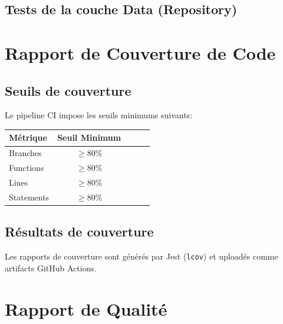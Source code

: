 \documentclass[12pt,a4paper]{report}
\begin{document}
\section{Tests de la couche Data (Repository)}

\begin{center}
\end{center}

\begin{center}
\end{center}

\chapter{Rapport de Couverture de Code}

\section{Seuils de couverture}

Le pipeline CI impose les seuils minimums suivants:

\begin{center}
    \begin{tabular}{lcccc}
        \toprule
        \textbf{Métrique} & \textbf{Seuil Minimum} \\
        \midrule
        Branches          & $\geq 80\%$            \\
        Functions         & $\geq 80\%$            \\
        Lines             & $\geq 80\%$            \\
        Statements        & $\geq 80\%$            \\
        \bottomrule
    \end{tabular}
\end{center}

\section{Résultats de couverture}

Les rapports de couverture sont générés par Jest (\texttt{lcov}) et uploadés
comme artifacts GitHub Actions.

\chapter{Rapport de Qualité}
\end{document}
